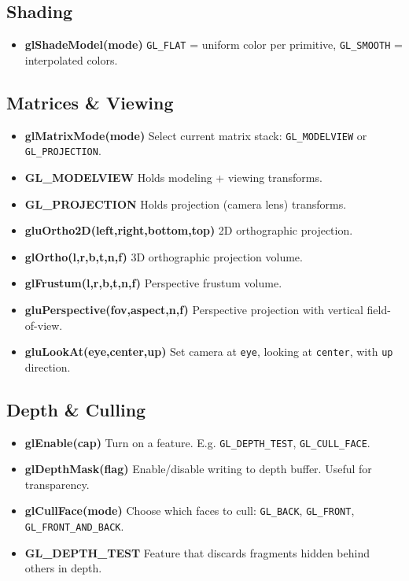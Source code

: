\documentclass[10pt,twocolumn]{extarticle}
\begin{document}
\subsection*{Shading}
\begin{itemize}
  \item \textbf{glShadeModel(mode)}  
  \texttt{GL\_FLAT} = uniform color per primitive,  
  \texttt{GL\_SMOOTH} = interpolated colors.
\end{itemize}

\subsection*{Matrices \& Viewing}
\begin{itemize}
  \item \textbf{glMatrixMode(mode)}  
  Select current matrix stack: \texttt{GL\_MODELVIEW} or \texttt{GL\_PROJECTION}.

  \item \textbf{GL\_MODELVIEW}  
  Holds modeling + viewing transforms.

  \item \textbf{GL\_PROJECTION}  
  Holds projection (camera lens) transforms.

  \item \textbf{gluOrtho2D(left,right,bottom,top)}  
  2D orthographic projection.

  \item \textbf{glOrtho(l,r,b,t,n,f)}  
  3D orthographic projection volume.

  \item \textbf{glFrustum(l,r,b,t,n,f)}  
  Perspective frustum volume.

  \item \textbf{gluPerspective(fov,aspect,n,f)}  
  Perspective projection with vertical field-of-view.

  \item \textbf{gluLookAt(eye,center,up)}  
  Set camera at \texttt{eye}, looking at \texttt{center}, with \texttt{up} direction.
\end{itemize}

\subsection*{Depth \& Culling}
\begin{itemize}
  \item \textbf{glEnable(cap)}  
  Turn on a feature. E.g. \texttt{GL\_DEPTH\_TEST}, \texttt{GL\_CULL\_FACE}.
  \item \textbf{glDepthMask(flag)}  
  Enable/disable writing to depth buffer. Useful for transparency.
  \item \textbf{glCullFace(mode)}  
  Choose which faces to cull: \texttt{GL\_BACK}, \texttt{GL\_FRONT}, \texttt{GL\_FRONT\_AND\_BACK}.
  \item \textbf{GL\_DEPTH\_TEST}  
  Feature that discards fragments hidden behind others in depth.
\end{itemize}
\end{document}
